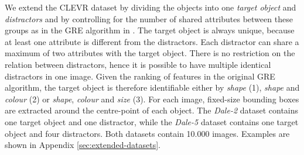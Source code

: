 \documentclass[11pt]{article}
\begin{document}
We extend the CLEVR dataset \citep{Johnson2016} by dividing the objects into one \emph{target object} and \emph{distractors}
and by controlling for the number of shared attributes between these groups as %
in the GRE algorithm in \citep{Dale1995}.
The target object is always unique, because at least one attribute is different from the distractors.
Each distractor can share a maximum of two attributes with the target object.
There is no restriction on the relation between distractors, hence it is possible to have multiple identical distractors in one image.
Given the ranking of features in the original GRE algorithm, the target object is therefore identifiable either by \emph{shape} (1), \emph{shape} and \emph{colour} (2) or \emph{shape}, \emph{colour} and \emph{size} (3).
For each image, fixed-size bounding boxes are extracted around the centre-point of each object.
%
The \emph{Dale-2} dataset contains one target object and one distractor, while the \emph{Dale-5} dataset contains one target object and four distractors.
Both datasets contain 10.000 images.
Examples are shown in
Appendix \ref{sec:extended-datasets}. %

\end{document}

